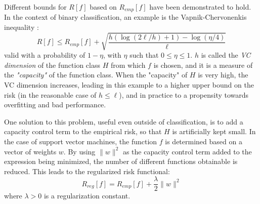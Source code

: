 \documentclass[12pt]{report}
\begin{document}
Different bounds for $ R[f] $ based on $ R_{emp}[f] $ have been demonstrated to hold. In the context of binary classification, an example is the Vapnik-Chervonenkis inequality \cite{vapnik95}:
\begin{equation} \label{vapnikbound}
R[f] \leq R_{emp}[f] + \sqrt{\dfrac{h(\log (2\ell /h) + 1) - \log (\eta /4)}{\ell}}
\end{equation}
valid with a probability of $ 1 - \eta $, with $ \eta $ such that $ 0 \leq \eta \leq 1 $. $ h $ is called the \textit{VC dimension} of the function class $ H $ from which $ f $ is chosen, and it is a measure of the \textit{"capacity"} of the function class. When the "capacity" of $ H $ is very high, the VC dimension increases, leading in this example to a higher upper bound on the risk (in the reasonable case of $ h \leq \ell $), and in practice to a propensity towards overfitting and bad performance.

One solution to this problem, useful even outside of classification, is to add a capacity control term to the empirical risk, so that $ H $ is artificially kept small. In the case of support vector machines, the function $ f $ is determined based on a vector of weights $ w $. By using $ \| w \|^2 $ as the capacity control term added to the expression being minimized, the number of different functions obtainable is reduced. This leads to the regularized risk functional:
\begin{equation} \label{regriskfun}
R_{reg}[f] = R_{emp}[f] + \dfrac{\lambda}{2}\| w \|^2
\end{equation}
where $ \lambda > 0 $ is a regularization constant.
\end{document}
